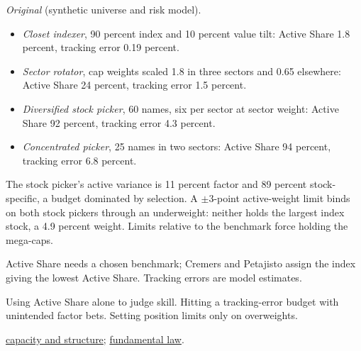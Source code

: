 \begin{qfmethod}
\emph{Original} (synthetic universe and risk model).
\begin{itemize}
\item \emph{Closet indexer}, 90 percent index and 10 percent value tilt: Active Share 1.8 percent, tracking error 0.19 percent.
\item \emph{Sector rotator}, cap weights scaled 1.8 in three sectors and 0.65 elsewhere: Active Share 24 percent, tracking error 1.5 percent.
\item \emph{Diversified stock picker}, 60 names, six per sector at sector weight: Active Share 92 percent, tracking error 4.3 percent.
\item \emph{Concentrated picker}, 25 names in two sectors: Active Share 94 percent, tracking error 6.8 percent.
\end{itemize}
The stock picker's active variance is 11 percent factor and 89 percent stock-specific, a budget dominated by selection. A $\pm3$-point active-weight limit binds on both stock pickers through an underweight: neither holds the largest index stock, a 4.9 percent weight. Limits relative to the benchmark force holding the mega-caps.

 Active Share needs a chosen benchmark; Cremers and Petajisto assign the index giving the lowest Active Share. Tracking errors are model estimates.

 Using Active Share alone to judge skill. Hitting a tracking-error budget with unintended factor bets. Setting position limits only on overweights.

 \hyperref[meth:equity-portfolio-capacity-structure]{capacity and structure}; \hyperref[res:fundamental-law-active-management]{fundamental law}.

\end{qfmethod}

